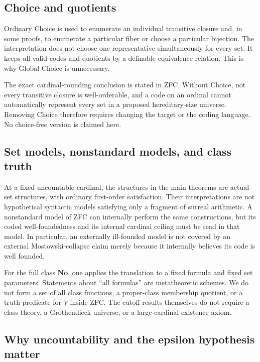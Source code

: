 \documentclass[11pt,letterpaper]{article}
\theoremstyle{definition}
\theoremstyle{remark}
\newcommand{\No}{\mathbf{No}}
\begin{document}
\subsection{Choice and quotients}

Ordinary Choice is used to enumerate an individual transitive closure and,
in some proofs, to enumerate a particular fiber or choose a particular
bijection. The interpretation does not choose one representative
simultaneously for every set. It keeps all valid codes and quotients by a
definable equivalence relation. This is why Global Choice is unnecessary.

The exact cardinal-rounding conclusion is stated in ZFC. Without Choice,
not every transitive closure is well-orderable, and a code on an ordinal
cannot automatically represent every set in a proposed hereditary-size
universe. Removing Choice therefore requires changing the target or the
coding language. No choice-free version is claimed here.

\subsection{Set models, nonstandard models, and class truth}

At a fixed uncountable cardinal, the structures in the main theorems are
actual set structures, with ordinary first-order satisfaction. Their
interpretations are not hypothetical syntactic models satisfying only a
fragment of surreal arithmetic. A nonstandard model of ZFC can internally
perform the same constructions, but its coded well-foundedness and its
internal cardinal ceiling must be read in that model. In particular, an
externally ill-founded model is not covered by an external Mostowski-collapse
claim merely because it internally believes its code is well founded.

For the full class $\No$, one applies the translation to a fixed formula
and fixed set parameters. Statements about ``all formulas'' are metatheoretic
schemes. We do not form a set of all class functions, a proper-class
membership quotient, or a truth predicate for $V$ inside ZFC. The cutoff
results themselves do not require a class theory, a Grothendieck universe,
or a large-cardinal existence axiom.

\subsection{Why uncountability and the epsilon hypothesis matter}
\end{document}

